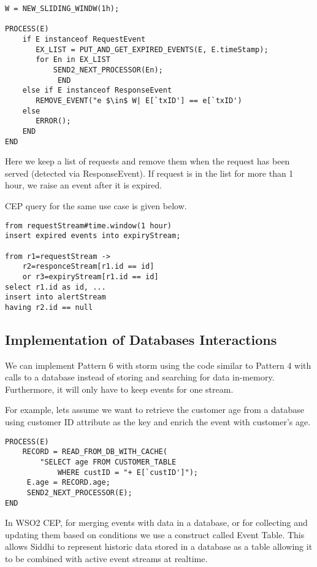 \documentclass{sig-alternate}
\begin{document}
{\begin{lstlisting}[mathescape, showstringspaces=false]
W = NEW_SLIDING_WINDW(1h); 

PROCESS(E)  
    if E instanceof RequestEvent
       EX_LIST = PUT_AND_GET_EXPIRED_EVENTS(E, E.timeStamp);
       for En in EX_LIST
           SEND2_NEXT_PROCESSOR(En); 
			END        
    else if E instanceof ResponseEvent
       REMOVE_EVENT("e $\in$ W| E[`txID'] == e[`txID') 
    else 
       ERROR();
    END   
END 
\end{lstlisting}


Here we keep a list of requests and remove them when the request has been served (detected via ResponseEvent). If request is in the list for more than 1 hour, we raise an event after it is expired. 

CEP query for the same use case is given below. 

\begin{lstlisting}[mathescape, showstringspaces=false]
from requestStream#time.window(1 hour)
insert expired events into expiryStream;

from r1=requestStream -> 
	r2=responceStream[r1.id == id] 
	or r3=expiryStream[r1.id == id]
select r1.id as id, ...
insert into alertStream 
having r2.id == null
\end{lstlisting}



\subsection{Implementation of Databases Interactions}
We can implement Pattern 6 with storm using the code similar to Pattern 4 with calls to a database instead of storing and searching for data in-memory. Furthermore, it will only have to keep events for one stream. 

For example, lets assume we want to retrieve the customer age from a database using customer ID attribute as the key and enrich the event with customer's age. 


\begin{lstlisting}[mathescape, showstringspaces=false]
PROCESS(E) 
	RECORD = READ_FROM_DB_WITH_CACHE(
		"SELECT age FROM CUSTOMER_TABLE 
			WHERE custID = "+ E[`custID']");    
	 E.age = RECORD.age;
	 SEND2_NEXT_PROCESSOR(E); 
END   
\end{lstlisting}



In WSO2 CEP, for merging events with data in a database, or for collecting and updating them based on conditions we use a construct called Event Table. This allows Siddhi to represent historic data stored in a database as a table allowing it to be combined with active event streams at realtime. 

}
\end{document}
